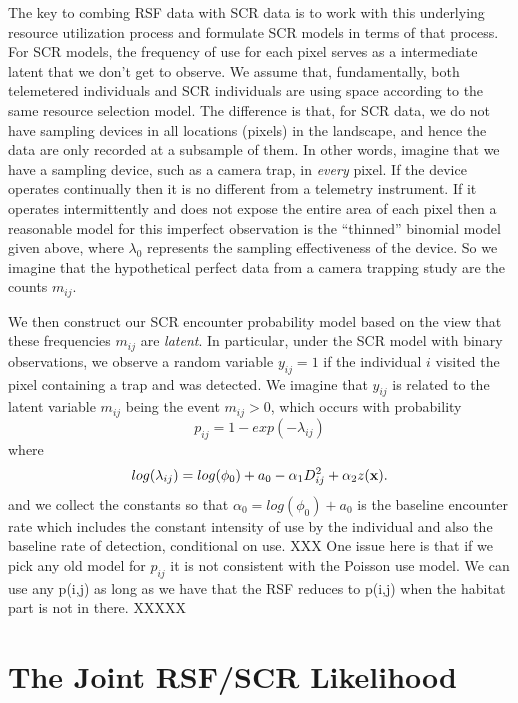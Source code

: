 The key to combing RSF data with SCR data is to work with this
underlying resource utilization process and formulate SCR models in
terms of that process. For SCR models, the frequency of use for each pixel
serves as a intermediate
latent that we don't get to observe. We assume that, fundamentally,
both telemetered individuals and SCR individuals are using space
according to the same resource selection model. The difference is that,
for SCR data, we 
do not have sampling devices in all locations (pixels) in the landscape, and hence the
data are only recorded at a subsample of them.
In other words, imagine that we have a sampling device, such as a
camera trap, in {\it every} pixel. If the device operates continually
then it is no different from a telemetry instrument. If it
operates  intermittently and does not expose the entire area of
each pixel then a reasonable model for this imperfect observation is
the ``thinned'' binomial model given above, where $\lambda_{0}$
represents the sampling effectiveness of the device. So we imagine
that the hypothetical perfect data from a camera trapping study are
the counts $m_{ij}$.

We then construct our SCR encounter probability model based on the
view that these frequencies $m_{ij}$ are {\it latent}. In particular,
under the SCR model with binary observations,
 we observe a random variable
$y_{ij} = 1$  if the individual $i$ visited the pixel
containing a trap and was detected.
We imagine that $y_{ij}$ is related to the latent variable $m_{ij}$ being the
event $m_{ij}>0$, which occurs with probability
\[
 p_{ij} = 1-exp(- \lambda_{ij})
\]
where 
\[
 log(\lambda_{ij}) = log(\phi_{0}) + a_{0} -\alpha_{1} D_{ij}^{2} +  \alpha_{2} z({\bf x}).
\]
and we collect the constants so that $\alpha_{0} = log(\phi_{0}) +
a_{0}$ is the 
 baseline encounter rate which includes
the constant intensity of use by the individual and also the baseline
rate of detection, conditional on use.
XXX One issue here is that if we pick any old model for $p_{ij}$ it is
not consistent with the Poisson use model. We can use any p(i,j) as
long as we have that the RSF reduces to p(i,j) when the habitat part
is not in there.
XXXXX


\section{The Joint RSF/SCR Likelihood}

